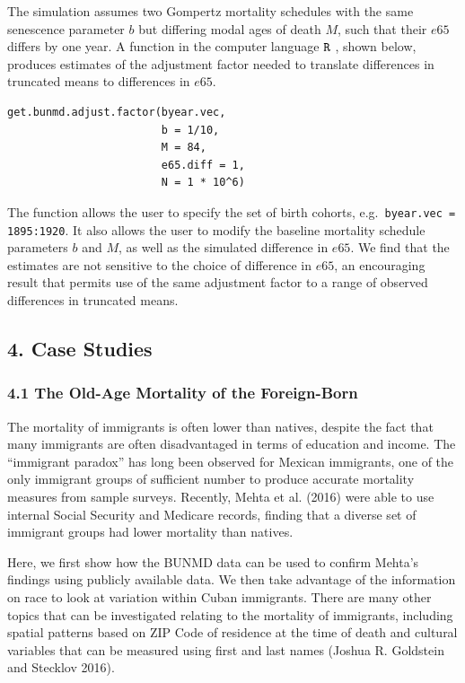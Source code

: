 \documentclass[
  11pt,
]{article}
\begin{document}
The simulation assumes two Gompertz mortality schedules with the same
senescence parameter \(b\) but differing modal ages of death \(M\), such
that their \(e65\) differs by one year. A function in the computer
language \({\tt R}\) , shown below, produces estimates of the adjustment
factor needed to translate differences in truncated means to differences
in \(e65\).

\begin{verbatim}
get.bunmd.adjust.factor(byear.vec,
                        b = 1/10, 
                        M = 84,
                        e65.diff = 1,
                        N = 1 * 10^6)
\end{verbatim}

The function allows the user to specify the set of birth cohorts,
e.g.~\texttt{byear.vec = 1895:1920}. It also allows the user to modify
the baseline mortality schedule parameters \(b\) and \(M\), as well as
the simulated difference in \(e65\). We find that the estimates are not
sensitive to the choice of difference in \(e65\), an encouraging result
that permits use of the same adjustment factor to a range of observed
differences in truncated means.

\hypertarget{case-studies}{%
\subsection{4. Case Studies}\label{case-studies}}

\hypertarget{the-old-age-mortality-of-the-foreign-born}{%
\subsubsection{4.1 The Old-Age Mortality of the
Foreign-Born}\label{the-old-age-mortality-of-the-foreign-born}}

The mortality of immigrants is often lower than natives, despite the
fact that many immigrants are often disadvantaged in terms of education
and income. The ``immigrant paradox'' has long been observed for Mexican
immigrants, one of the only immigrant groups of sufficient number to
produce accurate mortality measures from sample surveys. Recently, Mehta
et al. (2016) were able to use internal Social Security and Medicare
records, finding that a diverse set of immigrant groups had lower
mortality than natives.

Here, we first show how the BUNMD data can be used to confirm Mehta's
findings using publicly available data. We then take advantage of the
information on race to look at variation within Cuban immigrants. There
are many other topics that can be investigated relating to the mortality
of immigrants, including spatial patterns based on ZIP Code of residence
at the time of death and cultural variables that can be measured using
first and last names (Joshua R. Goldstein and Stecklov 2016).
\end{document}
